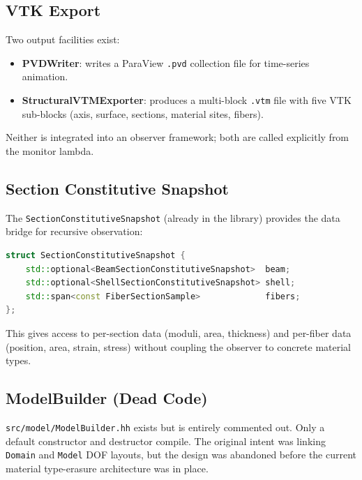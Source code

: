 \subsection{VTK Export}

Two output facilities exist:
\begin{itemize}
  \item \textbf{PVDWriter}: writes a ParaView \texttt{.pvd} collection
        file for time-series animation.
  \item \textbf{StructuralVTMExporter}: produces a multi-block
        \texttt{.vtm} file with five VTK sub-blocks (axis, surface,
        sections, material sites, fibers).
\end{itemize}
Neither is integrated into an observer framework; both are called
explicitly from the monitor lambda.

\subsection{Section Constitutive Snapshot}

The \texttt{SectionConstitutiveSnapshot} (already in the library) provides
the data bridge for recursive observation:
\begin{lstlisting}[language=C++,basicstyle=\ttfamily\small]
struct SectionConstitutiveSnapshot {
    std::optional<BeamSectionConstitutiveSnapshot>  beam;
    std::optional<ShellSectionConstitutiveSnapshot> shell;
    std::span<const FiberSectionSample>             fibers;
};
\end{lstlisting}
This gives access to per-section data (moduli, area, thickness) and
per-fiber data (position, area, strain, stress) without coupling the
observer to concrete material types.

\subsection{ModelBuilder (Dead Code)}

\texttt{src/model/ModelBuilder.hh} exists but is entirely commented out.
Only a default constructor and destructor compile.  The original intent
was linking \texttt{Domain} and \texttt{Model} DOF layouts, but the
design was abandoned before the current material type-erasure
architecture was in place.

